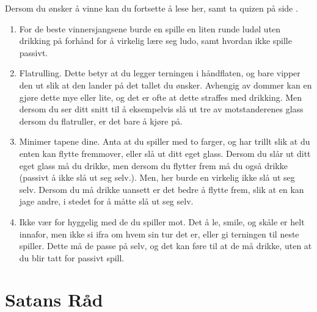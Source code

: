 \documentclass[10pt,a4paper,norsk,openany]{book}
\begin{document}
\noindent
Dersom du ønsker å vinne kan du fortsette å lese her, samt ta quizen på side
\pageref{chap:quiz}.
\begin{enumerate}
    
  \item For de beste
vinnersjangsene burde en spille en liten runde ludøl uten drikking på
    forhånd for å virkelig lære seg ludo, samt hvordan ikke spille passivt.
    
  \item Flatrulling. Dette betyr at du legger terningen i håndflaten, og bare
    vipper den ut slik at den lander på det tallet du ønsker. Avhengig av dommer
    kan en gjøre dette mye eller lite, og det er ofte at dette straffes med
    drikking. Men dersom du ser ditt snitt til å eksempelvis slå ut tre av
    motstanderenes glass dersom du flatruller, er det bare å kjøre på.
    
  \item Minimer tapene dine. Anta at du spiller med to farger, og har trillt
    slik at du enten kan flytte fremmover, eller slå ut ditt eget glass. Dersom
    du slår ut ditt eget glass må du drikke, men dersom du flytter frem må du også
    drikke (passivt å ikke slå ut seg selv.). Men, her burde en virkelig ikke slå
    ut seg selv. Dersom du må drikke uansett er det bedre å flytte frem, slik
    at en kan jage andre, i stedet for å måtte slå ut seg selv.
    
  \item Ikke vær for hyggelig med de du spiller mot. Det å le, smile, og skåle
    er helt innafor, men ikke si ifra om hvem sin tur det er, eller gi terningen
    til neste spiller. Dette må de passe på selv, og det kan føre til at de må
    drikke, uten at du blir tatt for passivt spill. 
\end{enumerate}


\section{Satans Råd}
\end{document}
